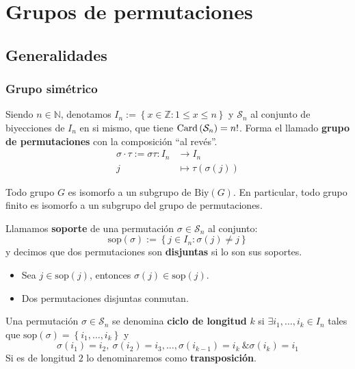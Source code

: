 \chapter{Grupos de permutaciones}
\section{Generalidades}
\subsection{Grupo simétrico}
Siendo $n \in \mathbb{N}$, denotamos $I_n := \left\{ x \in \mathbb{Z} : 1 \le x \le n \right\}$ y $\mathcal{S}_n$ al conjunto de biyecciones de $I_n$ en si mismo, que tiene $\operatorname{Card}\left( \mathcal{S}_n \right) = n!$. Forma el llamado \textbf{grupo de permutaciones} con la composición ``al revés''.
\begin{align*}
    \sigma \cdot \tau := \sigma \tau : I_n &\rightarrow I_n\\
    j &\mapsto \tau\left( \sigma \left( j \right) \right)
\end{align*}

\begin{theo}[de Cayley]
Todo grupo $G$ es isomorfo a un subgrupo de $\mathrm{Biy}\left( G \right)$. En particular, 
todo grupo finito es isomorfo a un subgrupo del grupo de permutaciones.
\end{theo}

\begin{defi}[Soporte]
Llamamos \textbf{soporte} de una permutación $\sigma \in \mathcal{S}_n$ al conjunto:
\[
\mathrm{sop}\left( \sigma \right) := \left\{ j \in I_n: \sigma\left( j \right) \neq j \right\}
\]
y decimos que dos permutaciones son \textbf{disjuntas} si lo son sus soportes.
\end{defi}

\begin{prop}
\begin{itemize}
    \item Sea $j \in \mathrm{sop}\left( j \right)$, entonces $\sigma\left( j \right) \in \mathrm{sop}\left( j \right)$.
    \item Dos permutaciones disjuntas conmutan.
\end{itemize}
\end{prop}

\begin{defi}[Ciclos]
Una permutación $\sigma \in \mathcal{S}_n$ se denomina \textbf{ciclo de longitud} $k$ si $\exists i_1, \ldots, i_k \in I_n$ tales que $\mathrm{sop}\left( \sigma \right) = \left\{ i_1, \ldots, i_k \right\}$ y
\[
    \sigma\left( i_1 \right) = i_2,\ \sigma\left( i_2 \right) = i_3, \ldots, \sigma\left( i_{k-1} \right) = i_k\ \& \sigma\left( i_k \right) = i_1
\]
Si es de longitud $2$ lo denominaremos como \textbf{transposición}.
\end{defi}

